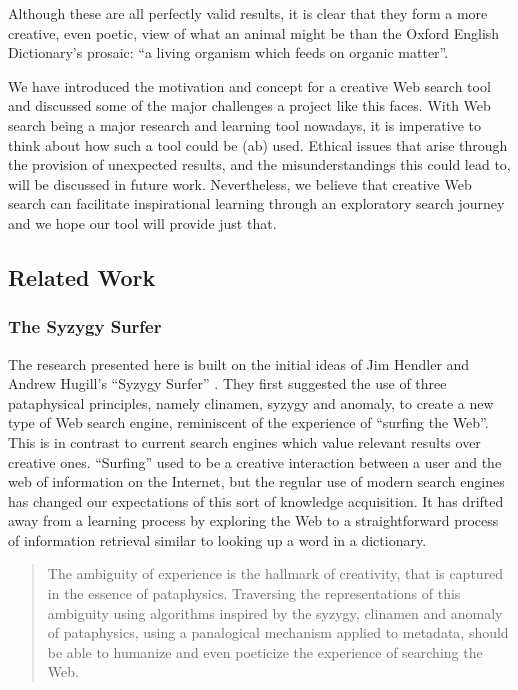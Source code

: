 Although these are all perfectly valid results, it is clear that they form a more creative, even poetic, view of what an animal might be than the Oxford English Dictionary's prosaic: ``a living organism which feeds on organic matter''.

We have introduced the motivation and concept for a creative Web search tool and discussed some of the major challenges a project like this faces. With Web search being a major research and learning tool nowadays, it is imperative to think about how such a tool could be (ab) used. Ethical issues that arise through the provision of unexpected results, and the misunderstandings this could lead to, will be discussed in future work. Nevertheless, we believe that creative Web search can facilitate inspirational learning through an exploratory search journey and we hope our tool will provide just that.


\subsection{Related Work}


\subsubsection*{The Syzygy Surfer}

The research presented here is built on the initial ideas of Jim Hendler and Andrew Hugill's ``Syzygy Surfer'' \citep{Hendler2011, Hendler2013}. They first suggested the use of three pataphysical principles, namely clinamen, syzygy and anomaly, to create a new type of Web search engine, reminiscent of the experience of ``surfing the Web''. This is in contrast to current search engines which value relevant results over creative ones. ``Surfing'' used to be a creative interaction between a user and the web of information on the Internet, but the regular use of modern search engines has changed our expectations of this sort of knowledge acquisition. It has drifted away from a learning process by exploring the Web to a straightforward process of information retrieval similar to looking up a word in a dictionary.

\begin{quote}
  The ambiguity of experience is the hallmark of creativity, that is captured in the essence of pataphysics. Traversing the representations of this ambiguity using algorithms inspired by the syzygy, clinamen and anomaly of pataphysics, using a panalogical mechanism applied to metadata, should be able to humanize and even poeticize the experience of searching the Web.\citep{Hendler2013}
\end{quote}

